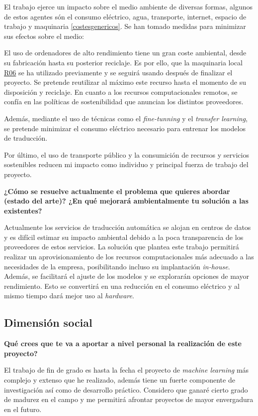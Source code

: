 El trabajo ejerce un impacto sobre el medio ambiente de diversas formas, algunos de estos
agentes són el consumo eléctrico, agua, transporte, internet, espacio de trabajo y maquinaria \ref{costesgenericos}.
Se han tomado medidas para minimizar sus efectos sobre el medio:

El uso de ordenadores de alto rendimiento tiene un gran coste ambiental,
desde su fabricación hasta su posterior reciclaje. Es por ello, que la maquinaria
local \hyperref[R06]{R06} se ha utilizado previamente y se seguirá usando después de
finalizar el proyecto. Se pretende reutilizar al máximo este recurso hasta el
momento de su disposición y reciclaje.
En cuanto a los recursos computacionales remotos, se confía en las políticas de sostenibilidad
\cite{awssustainability} que anuncian los distintos proveedores.

Además, mediante el uso de técnicas como el \textit{fine-tunning} y el
\textit{transfer learning}, se pretende minimizar el consumo eléctrico necesario para
entrenar los modelos de traducción.

Por último, el uso de transporte público y la consumición de recursos y servicios sostenibles
reducen mi impacto como individuo y principal fuerza de trabajo del proyecto. 

\textbf{¿Cómo se resuelve actualmente el problema que quieres abordar (estado del arte)?
¿En qué mejorará ambientalmente tu solución a las existentes?}

Actualmente los servicios de traducción automática se alojan en centros de datos y
es difícil estimar su impacto ambiental debido a la poca transparencia de los proveedores
de estos servicios. La solución que plantea este trabajo permitirá realizar un aprovisionamiento
de los recursos computacionales más adecuado a las necesidades de la empresa, posibilitando incluso
su implantación \textit{in-house}. Además, se facilitará el ajuste de los modelos y se
explorarán opciones de mayor rendimiento.
Esto se convertirá en una reducción en el consumo eléctrico y al mismo tiempo dará mejor uso al
\textit{hardware}.


\subsection{Dimensión social}
\textbf{Qué crees que te va a aportar a nivel personal la realización de este proyecto?}

El trabajo de fin de grado es hasta la fecha el proyecto de \textit{machine learning} más
complejo y extenso que he realizado, además tiene un fuerte componente de investigación
así como de desarrollo práctico. Considero que ganaré cierto grado de madurez
en el campo y me permitirá afrontar proyectos de mayor envergadura en el futuro.

